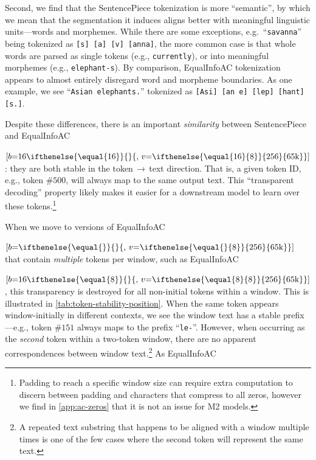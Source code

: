 Second, we find that the SentencePiece tokenization is more ``semantic'', by which we mean that the segmentation it induces aligns better with meaningful linguistic units---words and morphemes. While there are some exceptions, e.g.~``\texttt{savanna}'' being tokenized as \texttt{[s]\,[a]\,[v]\,[anna]}, the more common case is that whole words are parsed as single tokens (e.g., \texttt{currently}), or into meaningful morphemes (e.g., \texttt{elephant-s}). By comparison, EqualInfoAC tokenization appears to almost entirely disregard word and morpheme boundaries. As one example, we see ``\texttt{Asian elephants.}'' tokenized as \texttt{[Asi]\,[an~e]\,[lep]\,[hant]\,[s.]}.

Despite these differences, there is an important \emph{similarity} between SentencePiece and EqualInfoAC

  {$[b\mathord{=}16\ifthenelse{\equal{16}}{}{,\,v\mathord{=}\ifthenelse{\equal{16}{8}}{256}{65\text{k}}}]$}: they are both stable in the token\,$\rightarrow$\,text direction. That is, a given token ID, e.g., token \#$500$, will always map to the same output text. This ``transparent decoding'' property likely makes it easier for a downstream model to learn over these tokens.\footnote{Padding to reach a specific window size can require extra computation to discern between padding and characters that compress to all zeros, however we find in \ref{app:ac-zeros} that it is not an issue for M2 models.}

When we move to versions of EqualInfoAC
\ifthenelse{
    \equal{} \AND \equal{}
  }

  {$[b\mathord{=}\ifthenelse{\equal{}}{}{,\,v\mathord{=}\ifthenelse{\equal{}{8}}{256}{65\text{k}}}]$} that contain \emph{multiple} tokens per window, such as EqualInfoAC

  {$[b\mathord{=}16\ifthenelse{\equal{8}}{}{,\,v\mathord{=}\ifthenelse{\equal{8}{8}}{256}{65\text{k}}}]$}, this transparency is destroyed for all non-initial tokens within a window. This is illustrated in \ref{tab:token-stability-position}. When the same token appears window-initially in different contexts, we see the window text has a stable prefix---e.g., token \#$151$ always maps to the prefix ``\texttt{le-}''. However, when occurring as the \emph{second} token within a two-token window, there are no apparent correspondences between window text.\footnote{A repeated text substring that happens to be aligned with a window multiple times is one of the few cases where the second token will represent the same text.} As EqualInfoAC
\ifthenelse{
    \equal{} \AND \equal{}
  }

